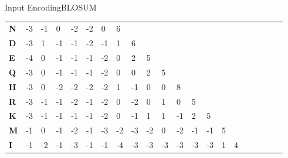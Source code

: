\documentclass[10pt]{beamer}
\newcommand{\1}{
	\setbeamertemplate{background}{
		\texttt{[image: img/1]}
		\tikz[overlay] \fill[fill opacity=0.75,fill=white] (0,0) rectangle (-\paperwidth,\paperheight);
	}
}
\begin{document}
\begin{frame}{Input Encoding}{BLOSUM}
\begin{table}[]
{\begin{tabular}{lllllllllllllllllllll}
				\textbf{N} & -3         & -1         & 0          & -2         & -2         & 0          & 6          &            &            &            &            &            &            &            &            &            &            &            &            &            \\
				\textbf{D} & -3         & 1          & -1         & -1         & -2         & -1         & 1          & 6          &            &            &            &            &            &            &            &            &            &            &            &            \\
				\textbf{E} & -4         & 0          & -1         & -1         & -1         & -2         & 0          & 2          & 5          &            &            &            &            &            &            &            &            &            &            &            \\
				\textbf{Q} & -3         & 0          & -1         & -1         & -1         & -2         & 0          & 0          & 2          & 5          &            &            &            &            &            &            &            &            &            &            \\
				\textbf{H} & -3         & 0          & -2         & -2         & -2         & -2         & 1          & -1         & 0          & 0          & 8          &            &            &            &            &            &            &            &            &            \\
				\textbf{R} & -3         & -1         & -1         & -2         & -1         & -2         & 0          & -2         & 0          & 1          & 0          & 5          &            &            &            &            &            &            &            &            \\
				\textbf{K} & -3         & -1         & -1         & -1         & -1         & -2         & 0          & -1         & 1          & 1          & -1         & 2          & 5          &            &            &            &            &            &            &            \\
				\textbf{M} & -1         & 0          & -1         & -2         & -1         & -3         & -2         & -3         & -2         & 0          & -2         & -1         & -1         & 5          &            &            &            &            &            &            \\
				\textbf{I} & -1         & -2         & -1         & -3         & -1         & -1         & -4         & -3         & -3         & -3         & -3         & -3         & -3         & 1          & 4          &            &            &            &            &            \\

\end{tabular}}
\end{table}
\end{frame}
\end{document}
